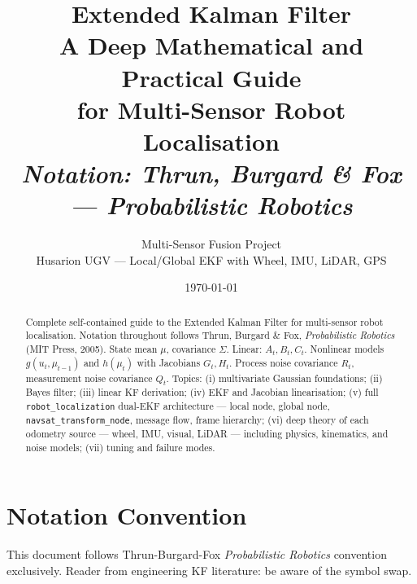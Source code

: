 \documentclass[11pt,a4paper]{article}
\title{\Huge\bfseries Extended Kalman Filter\\[0.5em]\Large A Deep Mathematical and Practical Guide\\[0.3em]\large for Multi-Sensor Robot Localisation\\[0.5em]\normalsize\itshape Notation: Thrun, Burgard \& Fox --- \emph{Probabilistic Robotics}}
\author{Multi-Sensor Fusion Project\\\small Husarion UGV --- Local/Global EKF with Wheel, IMU, LiDAR, GPS}
\date{\today}
\begin{document}
\maketitle

\begin{abstract}
\noindent Complete self-contained guide to the Extended Kalman Filter for multi-sensor robot localisation. Notation throughout follows Thrun, Burgard \& Fox, \emph{Probabilistic Robotics} (MIT Press, 2005). State mean $\mu$, covariance $\Sigma$. Linear: $A_t, B_t, C_t$. Nonlinear models $g(u_t, \mu_{t-1})$ and $h(\mu_t)$ with Jacobians $G_t, H_t$. Process noise covariance $R_t$, measurement noise covariance $Q_t$. Topics: (i) multivariate Gaussian foundations; (ii) Bayes filter; (iii) linear KF derivation; (iv) EKF and Jacobian linearisation; (v) full \texttt{robot\_localization} dual-EKF architecture --- local node, global node, \texttt{navsat\_transform\_node}, message flow, frame hierarchy; (vi) deep theory of each odometry source --- wheel, IMU, visual, LiDAR --- including physics, kinematics, and noise models; (vii) tuning and failure modes.
\end{abstract}

\tableofcontents
\newpage

\section{Notation Convention}

This document follows Thrun-Burgard-Fox \emph{Probabilistic Robotics} convention exclusively. Reader from engineering KF literature: be aware of the symbol swap.
\end{document}
